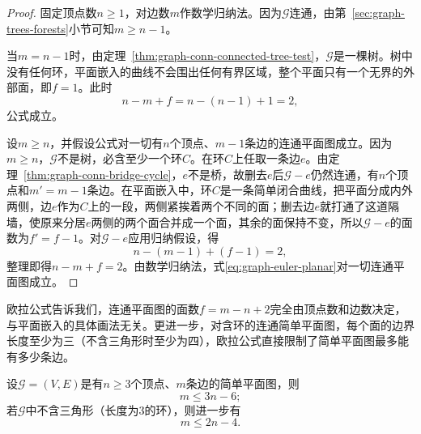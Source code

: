 \begin{proof}
固定顶点数$n\geq 1$，对边数$m$作数学归纳法。因为$\mathcal G$连通，由第~\ref{sec:graph-trees-forests}小节可知$m\geq n-1$。

当$m=n-1$时，由定理~\ref{thm:graph-conn-connected-tree-test}，$\mathcal G$是一棵树。树中没有任何环，平面嵌入的曲线不会围出任何有界区域，整个平面只有一个无界的外部面，即$f=1$。此时
\[
n - m + f = n - (n-1) + 1 = 2,
\]
公式成立。

设$m\geq n$，并假设公式对一切有$n$个顶点、$m-1$条边的连通平面图成立。因为$m\geq n$，$\mathcal G$不是树，必含至少一个环$C$。在环$C$上任取一条边$e$。由定理~\ref{thm:graph-conn-bridge-cycle}，$e$不是桥，故删去$e$后$\mathcal G-e$仍然连通，有$n$个顶点和$m'=m-1$条边。在平面嵌入中，环$C$是一条简单闭合曲线，把平面分成内外两侧，边$e$作为$C$上的一段，两侧紧挨着两个不同的面；删去边$e$就打通了这道隔墙，使原来分居$e$两侧的两个面合并成一个面，其余的面保持不变，所以$\mathcal G-e$的面数为$f'=f-1$。对$\mathcal G-e$应用归纳假设，得
\[
n - (m-1) + (f-1) = 2,
\]
整理即得$n - m + f = 2$。由数学归纳法，式\eqref{eq:graph-euler-planar}对一切连通平面图成立。
\end{proof}

欧拉公式告诉我们，连通平面图的面数$f=m-n+2$完全由顶点数和边数决定，与平面嵌入的具体画法无关。更进一步，对含环的连通简单平面图，每个面的边界长度至少为三（不含三角形时至少为四），欧拉公式直接限制了简单平面图最多能有多少条边。

\begin{theorem}[平面图的边数上界]
\label{thm:graph-planar-edge-bound}
设$\mathcal G=(V,E)$是有$n\geq 3$个顶点、$m$条边的简单平面图，则
\begin{equation}
m \leq 3n - 6;
\label{eq:graph-planar-edge-bound}
\end{equation}
若$\mathcal G$中不含三角形（长度为$3$的环），则进一步有
\begin{equation}
m \leq 2n - 4.
\label{eq:graph-planar-bipartite-bound}
\end{equation}
\end{theorem}

